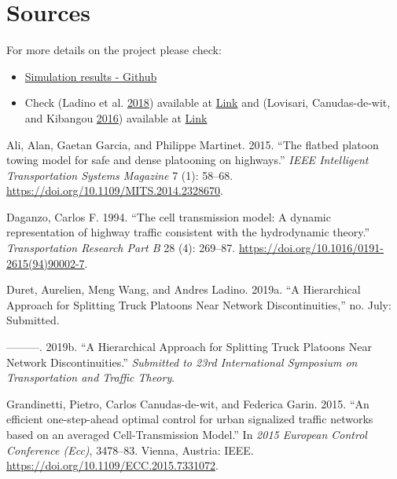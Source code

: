 \documentclass[]{book}
\theoremstyle{definition}
\theoremstyle{definition}
\theoremstyle{definition}
\theoremstyle{remark}
\begin{document}
\hypertarget{sources-2}{%
\section*{Sources}\label{sources-2}}

For more details on the project please check:

\begin{itemize}
\item
  \href{https://github.com/aladinoster/density-reconstruction}{Simulation
  results - Github}
\item
  Check (Ladino et al. \protect\hyperlink{ref-Ladino2018}{2018})
  available at
  \href{https://hal.archives-ouvertes.fr/hal-01731356}{Link} and
  (Lovisari, Canudas-de-wit, and Kibangou
  \protect\hyperlink{ref-Lovisari2016}{2016}) available at
  \href{https://hal.archives-ouvertes.fr/hal-01375928}{Link}
\end{itemize}

\hypertarget{refs}{}
\leavevmode\hypertarget{ref-Ali2015:ITSM}{}%
Ali, Alan, Gaetan Garcia, and Philippe Martinet. 2015. ``The flatbed
platoon towing model for safe and dense platooning on highways.''
\emph{IEEE Intelligent Transportation Systems Magazine} 7 (1): 58--68.
\url{https://doi.org/10.1109/MITS.2014.2328670}.

\leavevmode\hypertarget{ref-Daganzo1994:TR-B}{}%
Daganzo, Carlos F. 1994. ``The cell transmission model: A dynamic
representation of highway traffic consistent with the hydrodynamic
theory.'' \emph{Transportation Research Part B} 28 (4): 269--87.
\url{https://doi.org/10.1016/0191-2615(94)90002-7}.

\leavevmode\hypertarget{ref-Duret2019:ISTTT}{}%
Duret, Aurelien, Meng Wang, and Andres Ladino. 2019a. ``A Hierarchical
Approach for Splitting Truck Platoons Near Network Discontinuities,''
no. July: Submitted.

\leavevmode\hypertarget{ref-Duret2019}{}%
---------. 2019b. ``A Hierarchical Approach for Splitting Truck Platoons
Near Network Discontinuities.'' \emph{Submitted to 23rd International
Symposium on Transportation and Traffic Theory}.

\leavevmode\hypertarget{ref-Grandinetti2015}{}%
Grandinetti, Pietro, Carlos Canudas-de-wit, and Federica Garin. 2015.
``An efficient one-step-ahead optimal control for urban signalized
traffic networks based on an averaged Cell-Transmission Model.'' In
\emph{2015 European Control Conference (Ecc)}, 3478--83. Vienna,
Austria: IEEE. \url{https://doi.org/10.1109/ECC.2015.7331072}.
\end{document}
